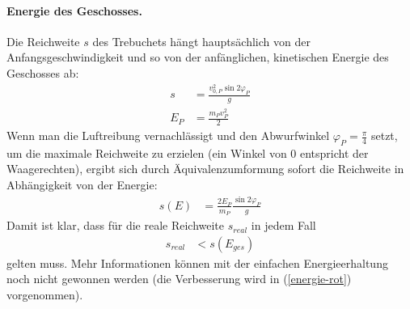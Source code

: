 \paragraph{Energie des Geschosses.}
Die Reichweite $s$ des Trebuchets hängt hauptsächlich von der Anfangsgeschwindigkeit und so von der anfänglichen, kinetischen Energie des Geschosses ab:
\begin{align}
\label{wurfweite}
s &= \frac{v_{0, P}^2 \sin{2\varphi_P}} {g} \\%
E_P &= \frac{m_P v_P^2}{2} %
\end{align}
Wenn man die Luftreibung vernachlässigt und den Abwurfwinkel $\varphi_P=\frac{\pi}{4}$ setzt, um die maximale Reichweite zu erzielen (ein Winkel von $0$ entspricht der Waagerechten), ergibt sich durch Äquivalenzumformung sofort die Reichweite in Abhängigkeit von der Energie:
\begin{align}
s(E) &= \frac{2 E_P}{ m_P}\frac{\sin{2\varphi_P}}{g}%
\end{align}
Damit ist klar, dass für die reale Reichweite $s_{real}$ in jedem Fall
\begin{align}
s_{real}&<s(E_{ges})
\end{align}
gelten muss. Mehr Informationen können mit der einfachen Energieerhaltung noch nicht gewonnen werden (die Verbesserung wird in (\ref{energie-rot}) vorgenommen).